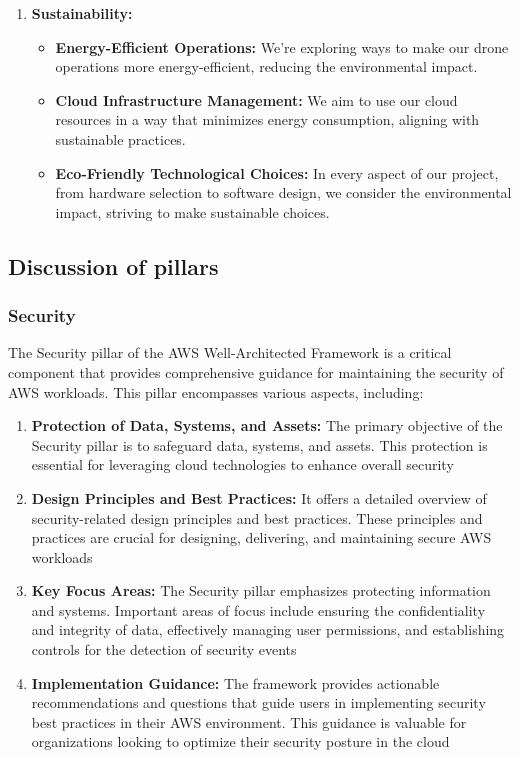\documentclass{article}
\begin{document}
\begin{enumerate}
    
    \item \textbf{Sustainability:} \cite{Sustainability}
    \begin{itemize}
        \item \textbf{Energy-Efficient Operations:} We're exploring ways to make our drone operations more energy-efficient, reducing the environmental impact.
        \item \textbf{Cloud Infrastructure Management:} We aim to use our cloud resources in a way that minimizes energy consumption, aligning with sustainable practices.
        \item  \textbf{Eco-Friendly Technological Choices:} In every aspect of our project, from hardware selection to software design, we consider the environmental impact, striving to make sustainable choices.
    \end{itemize}

    
\end{enumerate}

\subsection{Discussion of pillars}
\subsubsection{Security}
The Security pillar of the AWS Well-Architected Framework is a critical component that provides comprehensive guidance for maintaining the security of AWS workloads. This pillar encompasses various aspects, including:

\begin{enumerate}
    \item \textbf{Protection of Data, Systems, and Assets:} The primary objective of the Security pillar is to safeguard data, systems, and assets. This protection is essential for leveraging cloud technologies to enhance overall security
    \item \textbf{Design Principles and Best Practices:} It offers a detailed overview of security-related design principles and best practices. These principles and practices are crucial for designing, delivering, and maintaining secure AWS workloads
    \item \textbf{Key Focus Areas:} The Security pillar emphasizes protecting information and systems. Important areas of focus include ensuring the confidentiality and integrity of data, effectively managing user permissions, and establishing controls for the detection of security events
    \item \textbf{Implementation Guidance:} The framework provides actionable recommendations and questions that guide users in implementing security best practices in their AWS environment. This guidance is valuable for organizations looking to optimize their security posture in the cloud
\end{enumerate}
\end{document}
